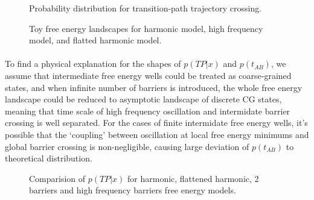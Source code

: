 \documentclass[11pt, a4paper]{article}
\begin{document}
 \begin{figure}[htp]
   \noindent{}
   \caption{Probability distribution for transition-path trajectory crossing.}
   \label{fig:tpx}
 \end{figure}
 \begin{figure}[htp]
   \noindent{}
   \caption{Toy free energy landscapes for harmonic model, high frequency model, and flatted harmonic model.}
   \label{fig:FELs_2}
 \end{figure}


\paragraph{}To find a physical explanation for the shapes of $p(TP|x)$ and $p(t_{AB})$, we assume that intermediate free energy wells could be treated as coarse-grained states, and when infinite number of barriers is introduced, the whole free energy landscape could be reduced to asymptotic landscape of discrete CG states,
meaning that time scale of high frequency oscillation and intermidate barrier crossing is well separated. For the cases of finite intermidate free energy wells, it's possible that the `coupling' between oscillation at local free energy minimums and global barrier crossing is
non-negligible, causing large deviation of $p(t_{AB})$ to theoretical distribution.

\begin{figure}[htp]
  \noindent{}
  \caption{Comparision of $p(TP|x)$ for harmonic, flattened harmonic, 2 barriers and high frequency barriers free energy models.}
  \label{fig:tpx_cp}
\end{figure}
\end{document}

